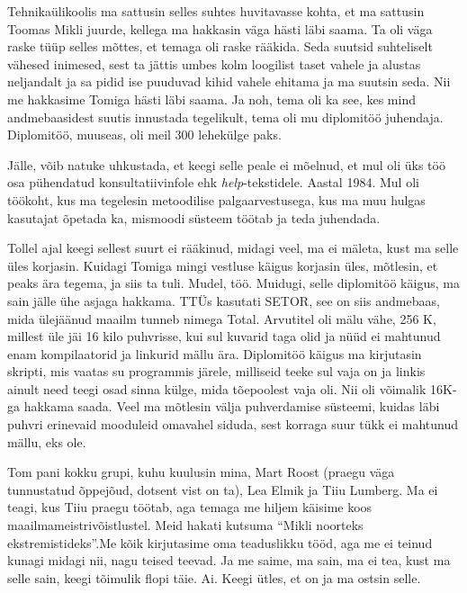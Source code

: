  
Tehnikaülikoolis ma sattusin selles suhtes huvitavasse kohta, et ma sattusin Toomas Mikli juurde, kellega ma hakkasin väga hästi läbi saama. Ta oli väga raske tüüp selles mõttes, et temaga oli raske rääkida. Seda suutsid suhteliselt vähesed inimesed, sest ta jättis umbes kolm loogilist taset vahele ja alustas neljandalt ja sa pidid ise puuduvad kihid vahele ehitama ja ma suutsin seda. Nii me hakkasime Tomiga hästi läbi saama. Ja noh, tema oli ka see, kes mind andmebaasidest suutis  innustada tegelikult, tema oli mu diplomitöö juhendaja. Diplomitöö, muuseas, oli meil 300 lehekülge paks. 

Jälle, võib natuke uhkustada, et keegi selle peale ei mõelnud, et mul oli üks töö osa pühendatud konsultatiivinfole ehk \emph{help}-tekstidele. Aastal 1984. Mul oli töökoht, kus ma tegelesin metoodilise palgaarvestusega, kus ma muu hulgas kasutajat õpetada ka, mismoodi süsteem töötab ja teda juhendada. 


Tollel ajal keegi sellest suurt ei rääkinud, midagi veel, ma ei mäleta, kust ma selle üles korjasin. Kuidagi Tomiga mingi vestluse käigus korjasin üles, mõtlesin, et peaks ära tegema, ja siis ta tuli. Mudel, töö. Muidugi, selle diplomitöö käigus, ma sain jälle ühe asjaga hakkama. TTÜs kasutati SETOR, see on siis andmebaas, mida ülejäänud maailm tunneb nimega Total. Arvutitel oli mälu vähe, 256 K, millest üle jäi 16 kilo puhvrisse, kui sul kuvarid taga olid ja nüüd ei mahtunud enam kompilaatorid ja linkurid mällu ära. Diplomitöö käigus ma kirjutasin skripti, mis vaatas su programmis järele, milliseid teeke sul vaja on ja linkis ainult need teegi osad sinna külge, mida tõepoolest vaja oli. Nii oli võimalik 16K-ga hakkama saada. Veel ma mõtlesin välja puhverdamise süsteemi, kuidas läbi puhvri erinevaid mooduleid omavahel siduda, sest korraga suur tükk ei mahtunud mällu, eks ole. 

Tom pani kokku grupi, kuhu kuulusin mina, Mart Roost (praegu väga tunnustatud õppejõud, dotsent vist on ta), Lea Elmik ja Tiiu Lumberg. Ma ei teagi, kus Tiiu praegu töötab, aga temaga me hiljem käisime koos maailmameistrivõistlustel. Meid hakati kutsuma \enquote{Mikli noorteks ekstremistideks}.Me  kõik kirjutasime oma teaduslikku tööd, aga me ei teinud kunagi midagi nii, nagu teised teevad. Ja me saime, ma sain, ma ei tea, kust ma selle sain, keegi tõimulik flopi täie. Ai. Keegi ütles, et on ja ma ostsin selle. 


